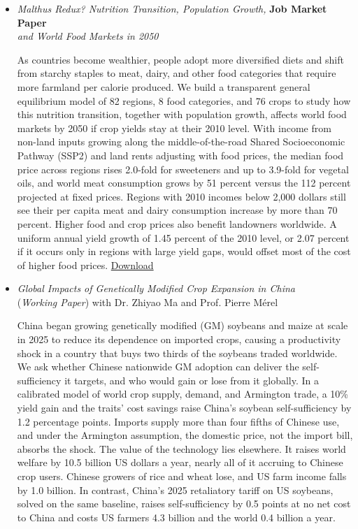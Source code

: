 \documentclass{article}[12]
\begin{document}
\begin{itemize}[itemsep=1.5em]

\item \emph{Malthus Redux? Nutrition Transition, Population Growth, }
 \hfill \textbf{Job Market Paper} \\ \emph{and World Food Markets in 2050}

As countries become wealthier, people adopt more diversified diets and shift from starchy staples to meat, dairy, and other food categories that require more farmland per calorie produced. We build a transparent general equilibrium model of 82 regions, 8 food categories, and 76 crops to study how this nutrition transition, together with population growth, affects world food markets by 2050 if crop yields stay at their 2010 level. With income from non-land inputs growing along the middle-of-the-road Shared Socioeconomic Pathway (SSP2) and land rents adjusting with food prices, the median food price across regions rises 2.0-fold for sweeteners and up to 3.9-fold for vegetal oils, and world meat consumption grows by 51 percent versus the 112 percent projected at fixed prices. Regions with 2010 incomes below 2,000 dollars still see their per capita meat and dairy consumption increase by more than 70 percent. Higher food and crop prices also benefit landowners worldwide. A uniform annual yield growth of 1.45 percent of the 2010 level, or 2.07 percent if it occurs only in regions with large yield gaps, would offset most of the cost of higher food prices.
\href{https://cliobserver.github.io/zhiran-AgEcon.github.io/files/Zhiran_Qin_JMP.pdf}{Download}

\item \emph{Global Impacts of Genetically Modified Crop Expansion in China}
\\ (\emph{Working Paper}) with Dr. Zhiyao Ma and Prof. Pierre M\'erel

China began growing genetically modified (GM) soybeans and maize at scale in 2025 to reduce its dependence on imported crops, causing a productivity shock in a country that buys two thirds of the soybeans traded worldwide. We ask whether Chinese nationwide GM adoption can deliver the self-sufficiency it targets, and who would gain or lose from it globally. In a calibrated model of world crop supply, demand, and Armington trade, a 10\% yield gain and the traits' cost savings raise China's soybean self-sufficiency by 1.2 percentage points. Imports supply more than four fifths of Chinese use, and under the Armington assumption, the domestic price, not the import bill, absorbs the shock. The value of the technology lies elsewhere. It raises world welfare by 10.5 billion US dollars a year, nearly all of it accruing to Chinese crop users. Chinese growers of rice and wheat lose, and US farm income falls by 1.0 billion. In contrast, China's 2025 retaliatory tariff on US soybeans, solved on the same baseline, raises self-sufficiency by 0.5 points at no net cost to China and costs US farmers 4.3 billion and the world 0.4 billion a year.


\end{itemize}
\end{document}
